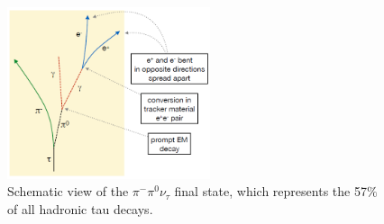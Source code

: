 \begin{figure}[ht]
  \begin{center}
    \includegraphics[width=0.53\textwidth]{figuras/Chapter3/taudecays2.png}
    \caption{Schematic view of the $\pi^{-}\pi^{0}\nu_{\tau}$ final state, which represents the 57$\%$ of all hadronic tau decays.}
    \label{fig:taudecays2}
  \end{center}
\end{figure} 

